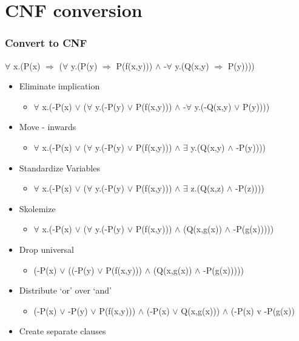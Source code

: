 \documentclass[compress, 9pt]{beamer}
\begin{document}
\section{CNF conversion}
\label{sec-3}
\begin{frame}
\frametitle{Convert to CNF}
\label{sec-3-1}

$\forall$ x.(P(x) $\Rightarrow$ ($\forall$ y.(P(y) $\Rightarrow$ P(f(x,y))) $\wedge$ -$\forall$ y.(Q(x,y) $\Rightarrow$ P(y))))
\begin{itemize}
\item <2-> Eliminate implication
\begin{itemize}
\item <3-> $\forall$ x.(-P(x) $\vee$ ($\forall$ y.(-P(y) $\vee$ P(f(x,y))) $\wedge$ -$\forall$ y.(-Q(x,y) $\vee$ P(y))))
\end{itemize}
\item <4-> Move - inwards
\begin{itemize}
\item <5-> $\forall$ x.(-P(x) $\vee$ ($\forall$ y.(-P(y) $\vee$ P(f(x,y))) $\wedge$ $\exists$ y.(Q(x,y) $\wedge$ -P(y))))
\end{itemize}
\item <6-> Standardize Variables
\begin{itemize}
\item <7-> $\forall$ x.(-P(x) $\vee$ ($\forall$ y.(-P(y) $\vee$ P(f(x,y))) $\wedge$ $\exists$ z.(Q(x,z) $\wedge$ -P(z))))
\end{itemize}
\item <8-> Skolemize
\begin{itemize}
\item <9-> $\forall$ x.(-P(x) $\vee$ ($\forall$ y.(-P(y) $\vee$ P(f(x,y))) $\wedge$ (Q(x,g(x)) $\wedge$ -P(g(x)))))
\end{itemize}
\item <10-> Drop universal
\begin{itemize}
\item <11->(-P(x) $\vee$ ((-P(y) $\vee$ P(f(x,y))) $\wedge$ (Q(x,g(x)) $\wedge$ -P(g(x)))))
\end{itemize}
\item <12-> Distribute `or' over `and'
\begin{itemize}
\item <13-> (-P(x) $\vee$ -P(y) $\vee$ P(f(x,y))) $\wedge$ (-P(x) $\vee$ Q(x,g(x)))
    $\wedge$ (-P(x) v -P(g(x))
\end{itemize}
\item <14-> Create separate clauses

\end{itemize}
\end{frame}
\end{document}
